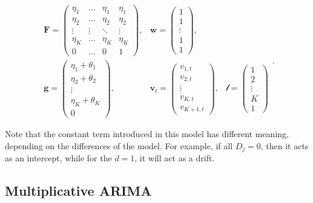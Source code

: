 \documentclass[
]{book}
\theoremstyle{definition}
\theoremstyle{definition}
\theoremstyle{definition}
\theoremstyle{definition}
\theoremstyle{remark}
\begin{document}
\begin{equation}
  \begin{aligned}
    \mathbf{F} = \begin{pmatrix} \eta_1 & \dots & \eta_1 & \eta_1 \\ \eta_2 & \dots & \eta_2 & \eta_2 \\ \vdots & \vdots & \ddots & \vdots \\ \eta_K & \dots & \eta_K & \eta_K \\ 0 & \dots & 0 & 1 \end{pmatrix}, & \mathbf{w} = \begin{pmatrix} 1 \\ 1 \\ \vdots \\ 1 \\ 1 \end{pmatrix}, \\
    \mathbf{g} = \begin{pmatrix} \eta_1 + \theta_1 \\ \eta_2 + \theta_2 \\ \vdots \\ \eta_K + \theta_K \\ 0 \end{pmatrix}, & \mathbf{v}_{t} = \begin{pmatrix} v_{1,t} \\ v_{2,t} \\ \vdots \\ v_{K,t} \\ v_{K+1,t} \end{pmatrix}, & \boldsymbol{\mathscr{l}} = \begin{pmatrix} 1 \\ 2 \\ \vdots \\ K \\ 1 \end{pmatrix}
  \end{aligned}.
  \label{eq:ADAMARIMAMatricesConstant}
\end{equation}

Note that the constant term introduced in this model has different meaning, depending on the differences of the model. For example, if all \(D_j=0\), then it acts as an intercept, while for the \(d=1\), it will act as a drift.

\hypertarget{ADAMARIMAPureMultiplicative}{%
\subsection{Multiplicative ARIMA}\label{ADAMARIMAPureMultiplicative}}
\end{document}
